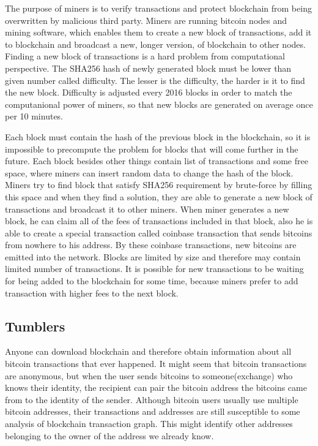 \documentclass[
  digital, %
  table,   %
  lof,     %
  lot,     %
  oneside
]{fithesis3}
\begin{document}
The purpose of miners is to verify transactions and protect blockchain
from being overwritten by malicious third party.
Miners are running bitcoin nodes and mining software,
which enables them to create a new block of transactions,
add it to blockchain and broadcast a new, longer version, of blockchain to other nodes.
Finding a new block of transactions is a hard problem from computational perspective.
The SHA256 hash of newly generated block must be lower than given number called difficulty.
The lesser is the difficulty, the harder is it to find the new block.
Difficulty is adjusted every 2016 blocks in order to match the computanional power of miners,
so that new blocks are generated on average once per 10 minutes.

Each block must contain the hash of the previous block in the blockchain, so it is impossible
to precompute the problem for blocks that will come further in the future. 
Each block besides other things contain list of transactions and some free space,
where miners can insert random data to change the hash of the block.
Miners try to find block that satisfy SHA256 requirement
by brute-force by filling this space and when they find a solution,
they are able to generate a new block of transactions and broadcast it to other miners.
When miner generates a new block, he can claim all of the fees of transactions included in that block,
also he is able to create a special transaction called coinbase transaction that sends bitcoins from
nowhere to his address. By these coinbase transactions, new bitcoins are emitted into the network.
Blocks are limited by size and therefore may contain limited number of transactions.
It is possible for new transactions to be waiting for being added to the blockchain for some time,
because miners prefer to add transaction with higher fees to the next block.

\subsection{Tumblers}
Anyone can download blockchain and therefore obtain information about all bitcoin transactions that ever happened.
It might seem that bitcoin transactions are anonymous, but when the user sends bitcoins to
someone(exchange) who knows their identity, the recipient can pair the bitcoin address
the bitcoins came from to the identity of the sender.
Although bitcoin users usually use multiple bitcoin addresses,
their transactions and addresses are still 
susceptible to some analysis of blockchain transaction graph.
This might identify other addresses belonging to the owner of the address we already know.
\end{document}
